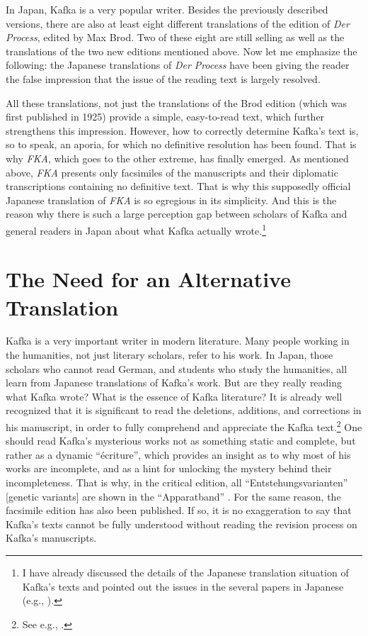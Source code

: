 \documentclass{article}
\begin{document}
In Japan, Kafka is a very popular writer. Besides the previously
described versions, there are also at least eight different translations
of the edition of \emph{Der Process}, edited by Max Brod. Two of these
eight \citep{kafka_shinpan_1953,kafka_shinpan_1966} are still selling as well as the translations
of the two new editions mentioned above. Now let me emphasize the
following: the Japanese translations of \emph{Der Process} have been
giving the reader the false impression that the issue of the reading
text is largely resolved.

All these translations, not just the translations of the Brod edition (which
was first published in 1925) provide a simple, easy-to-read text, which
further strengthens this impression. However, how to correctly determine
Kafka's text is, so to speak, an aporia, for which no definitive
resolution has been found. That is why \emph{FKA}, which goes to the
other extreme, has finally emerged. As mentioned above, \emph{FKA}
presents only facsimiles of the manuscripts and their diplomatic
transcriptions containing no definitive text. That is why this supposedly
official Japanese translation of \emph{FKA} is so egregious in its
simplicity. And this is the reason why there is such a large perception
gap between scholars of Kafka and general readers in Japan about what
Kafka actually wrote.\footnote{I have already discussed the details of
  the Japanese translation situation of Kafka's texts and pointed out
  the issues in the several papers in Japanese (e.g., \cite{myojo_kyokaisen_2012,myojo_honyakukano_2019}).}

\section{The Need for an Alternative
Translation}\label{the-need-for-an-alternative-translation}

Kafka is a very important writer in modern literature. Many people
working in the humanities, not just literary scholars, refer to his
work. In Japan, those scholars who cannot read German, and students who
study the humanities, all learn from Japanese translations of Kafka's
work. But are they really reading what Kafka wrote? What is the essence
of Kafka literature? It is already well recognized that it is
significant to read the deletions, additions, and corrections in his
manuscript, in order to fully comprehend and appreciate the Kafka
text.\footnote{See e.g., \cite{pasley_schrift_1995,schutterle_franz_2002,battegay_schrift_2010,kleinwort_spate_2013}.} One should read Kafka's mysterious works not as
something static and complete, but rather as a dynamic ``écriture'',
which provides an insight as to why most of his works are incomplete,
and as a hint for unlocking the mystery behind their incompleteness.
That is why, in the critical edition, all ``Entstehungsvarianten'' {[}genetic variants{]} are
shown in the ``Apparatband'' \citep[see][161--350]{kafka_proces_1990}. For the same
reason, the facsimile edition has also been published. If so, it is no
exaggeration to say that Kafka's texts cannot be fully understood
without reading the revision process on Kafka's manuscripts.
\end{document}
